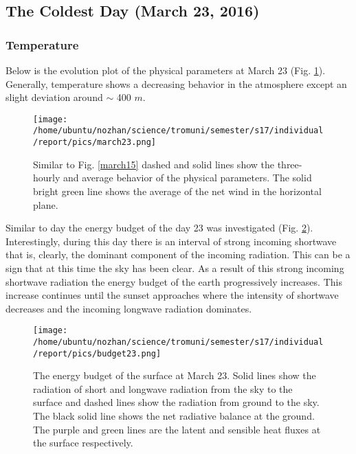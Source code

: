 \documentclass[a4paper,12pt]{article}
\numberwithin{equation}{section} %
\begin{document}

\subsection{The Coldest Day (March 23, 2016)}

\subsubsection{Temperature}

Below is the evolution plot of the physical parameters at March 23 (Fig. \ref{march23}). Generally, temperature shows a decreasing behavior in the atmosphere except an slight deviation around $\sim$ 400 $m$.

\begin{figure}[bhp]
\texttt{[image: /home/ubuntu/nozhan/science/tromuni/semester/s17/individual/report/pics/march23.png]}
\caption{Similar to Fig. \ref{march15} dashed and solid lines show the three-hourly and average behavior of the physical parameters. The solid bright green line shows the average of the net wind in the horizontal plane.}
\label{march23}
\end{figure}

\vspace{0.5cm}

Similar to day  the energy budget of the day 23 was investigated (Fig. \ref{budget23}). Interestingly, during this day there is an interval of strong incoming shortwave that is, clearly, the dominant component of the incoming radiation. This can be a sign that at this time the sky has been clear. As a result of this strong incoming shortwave radiation the energy budget of the earth progressively increases. This increase continues until the sunset approaches where the intensity of shortwave decreases and the incoming longwave radiation dominates. 

\begin{figure}[bhp]
\texttt{[image: /home/ubuntu/nozhan/science/tromuni/semester/s17/individual/report/pics/budget23.png]}
\caption{The energy budget of the surface at March 23. Solid lines show the radiation of short and longwave radiation from the sky to the surface and dashed lines show the radiation from ground to the sky. The black solid line shows the net radiative balance at the ground. The purple and green lines are the latent and sensible heat fluxes at the surface respectively.}
\label{budget23}
\end{figure}
\end{document}
